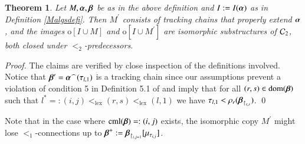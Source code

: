 \documentclass[3p,10pt,times]{elsarticle}
\newcommand{\al}{\alpha}
\newcommand{\alvec}{{\vec{\al}}}
\newcommand{\be}{\beta}
\newcommand{\bevec}{{\vec{\be}}}
\newcommand{\bevecpr}{{\vec{\be}'}}
\newcommand{\lo}{<_1}
\newcommand{\klex}{<_\mathrm{\scriptscriptstyle{lex}}}
\newcommand{\Ctwo}{{{\cal C}_2}}
\newtheorem{theo}{Theorem}[section]
\newcommand{\ktwo}{<_2}
\newcommand{\dom}{\mathrm{dom}}
\newcommand{\taucp}[1]{{\tau_{#1}}}
\newcommand{\ov}{\mathrm{o}}
\newcommand{\cml}{\operatorname{cml}}
\def\vec#1{\mathchoice{\mbox{\boldmath$\displaystyle#1$}}
{\mbox{\boldmath$\textstyle#1$}}
{\mbox{\boldmath$\scriptstyle#1$}}
{\mbox{\boldmath$\scriptscriptstyle#1$}}}
\begin{document}
\begin{theo}\label{verttrantheo} Let $M,\alvec,\bevec$ be as in the above definition and $I:=I(\alvec)$ as in Definition \ref{Malgsdefi}. 
Then $M^\prime$ consists of tracking chains that properly extend $\alvec$, 
and the images $\ov[I\cup M]$ and $\ov[I\cup M^\prime]$ are isomorphic substructures of $\Ctwo$, both closed under $\ktwo$-predecessors.
\end{theo}
\begin{proof} The claims are verified by close inspection of the definitions involved.
Notice that $\bevecpr=\alvec^\frown(\taucp{l,1})$ is a tracking chain since our assumptions
prevent a violation of condition 5 in Definition 5.1 of \cite{CWc} and 
imply that for all $(r,s)\in\dom(\bevec)$ such that $l^*=:(i,j)\klex(r,s)\klex(l,1)$ we have 
$\taucp{l,1}<\rho_r(\bevec_{\restriction_{r,s}})$. 
\qed \end{proof}
\begin{rmk} Note that in the case where $\cml(\bevec)=:(i,j)$ exists, 
the isomorphic copy $M^\prime$ might lose $\lo$-connections up to $\bevec^+:=\bevec_{\restriction_{i,j+1}}[\mu_{\taucp{i,j}}]$.
\end{rmk}
\end{document}
